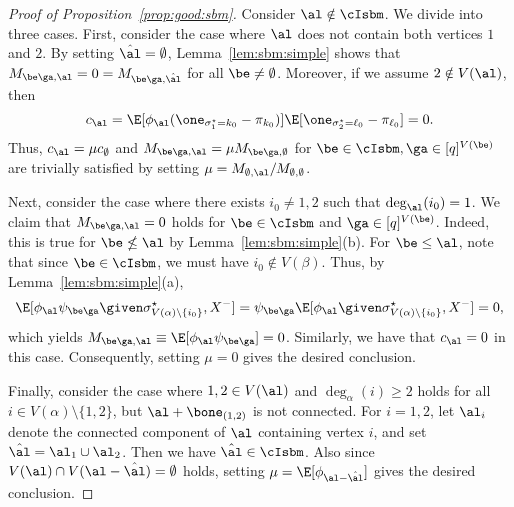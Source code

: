 \documentclass[11pt]{article}
\begin{document}
\begin{proof}[Proof of Proposition~\ref{prop:good:sbm}]
    Consider $\al\notin \cIsbm$. We divide into three cases. First, consider the case where $\al$ does not contain both vertices $1$ and $2$. By setting $\hat\al=\emptyset$, Lemma~\ref{lem:sbm:simple} shows that $M_{\be\ga,\al}=0=M_{\be\ga,\hat\al}$ for all $\be\neq \emptyset$. Moreover, if we assume $2\notin V(\al)$, then 
    \[
    c_{\al}= \E[\phi_{\al}(\one_{\sigma^\star_1=k_0}-\pi_{k_0})]\E[\one_{\sigma^\star_2=\ell_0}-\pi_{\ell_0}]=0.
    \]
    Thus, $c_{\al}=\mu c_{\emptyset}$ and $M_{\be\ga,\al}=\mu M_{\be\ga,\emptyset}$ for $\be\in \cIsbm, \ga\in [q]^{V(\be)}$ are trivially satisfied by setting $\mu=M_{\emptyset,\al}/M_{\emptyset,\emptyset}$. 

    Next, consider the case where there exists $i_0\neq 1,2$ such that $\deg_{\al}(i_0)=1$. We claim that $M_{\be\ga,\al}=0$ holds for $\be\in \cIsbm$ and $\ga\in [q]^{V(\be)}$. Indeed, this is true for $\be\nleq \al$ by Lemma~\ref{lem:sbm:simple}(b). For $\be\leq \al$, note that since $\be\in \cIsbm$, we must have $i_0\notin V(\beta)$. Thus, by Lemma~\ref{lem:sbm:simple}(a),  
    \[
    \E[\phi_{\al}\psi_{\be\ga}\given \sigma^\star_{V(\alpha)\setminus\{i_0\}}, X^{-}]=\psi_{\be\ga}\E[\phi_{\al}\given \sigma^\star_{V(\alpha)\setminus\{i_0\}}, X^{-}]=0,
    \]
    which yields $M_{\be\ga,\al}\equiv \E[\phi_{\al}\psi_{\be\ga}]=0$. Similarly, we have that $c_{\al}=0$ in this case. Consequently, setting $\mu=0$ gives the desired conclusion.


    
    Finally, consider the case where $1,2\in V(\al)$ and $\deg_{\alpha}(i)\geq 2$ holds for all $i\in V(\alpha)\setminus\{1,2\}$, but $\al+\bone_{(1,2)}$ is not connected. For $i=1,2$, let $\al_i$ denote the connected component of $\al$ containing vertex $i$, and set $\hat \al=\al_1\cup \al_2$. Then we have $\hat\al \in \cIsbm$. Also since $V(\al) \cap V(\al-\hat\al)=\emptyset$ holds, setting $\mu=\E[\phi_{\al-\hat\al}]$ gives the desired conclusion. 
\end{proof}
\end{document}
